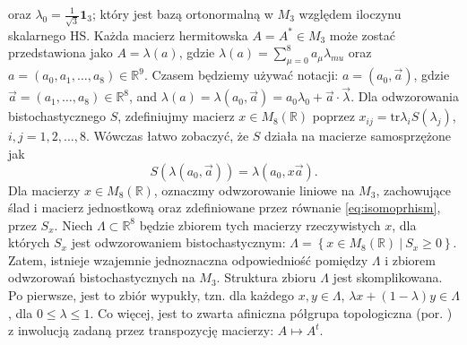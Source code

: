 oraz $\lambda_{0} = \frac{1}{\sqrt{3}} \mathbf{1}_{3}$;
który jest bazą ortonormalną w $M_{3}$ względem iloczynu skalarnego HS.
Każda macierz hermitowska $A = A^{*} \in M_{3}$ może zostać przedstawiona
jako $A = \lambda(a)$, gdzie
$\lambda(a) = \sum_{\mu=0}^{8} a_{\mu} \lambda_{mu}$
oraz
$a = (a_{0}, a_{1}, \ldots, a_{8}) \in \mathbb{R}^{9}$.
Czasem będziemy używać notacji:
$a = (a_{0}, \vec{a})$,
gdzie $\vec{a} = (a_{1},\ldots,a_{8}) \in \mathbb{R}^{8}$,
and $\lambda(a) = \lambda(a_{0}, \vec{a}) = a_{0} \lambda_{0} + \vec{a} \cdot \vec{\lambda}$.
Dla odwzorowania bistochastycznego $S$,
zdefiniujmy macierz $x \in M_{8}(\mathbb{R})$ poprzez
$x_{ij} = \text{tr} \lambda_{i} S(\lambda_{j})$,
$i,j = 1,2,\ldots,8$.
Wówczas łatwo zobaczyć, że $S$ działa na macierze samosprzężone jak
\begin{equation}
\label{eq:isomoprhism}
S(\lambda(a_{0}, \vec{a})) = \lambda(a_{0}, x \vec{a}).
\end{equation}
Dla macierzy $x \in M_{8}(\mathbb{R})$,
oznaczmy odwzorowanie liniowe na $M_{3}$,
zachowujące ślad i macierz jednostkową
oraz zdefiniowane przez równanie \eqref{eq:isomoprhism},
przez $S_{x}$.
Niech $\Lambda \subset \mathbb{R}^{8}$ będzie zbiorem tych macierzy
rzeczywistych $x$,
dla których $S_{x}$ jest odwzorowaniem bistochastycznym:
$\Lambda = \left \{ x \in M_{8}(\mathbb{R}) \: |  \: S_{x} \geq 0 \right \}$.
Zatem, istnieje wzajemnie jednoznaczna odpowiedniość pomiędzy $\Lambda$
i zbiorem odwzorowań bistochastycznych na $M_{3}$.
Struktura zbioru $\Lambda$ jest skomplikowana.
Po pierwsze, jest to zbiór wypukły,
tzn. dla każdego $x,y \in \Lambda$,
$\lambda x + (1-\lambda)y \in \Lambda$,
dla $0 \leq \lambda \leq 1$.
Co więcej, jest to zwarta afiniczna półgrupa topologiczna
(por. \cite{schwarz1955hausdorff,chow1975compact})
z inwolucją zadaną przez transpozycję macierzy: $A \mapsto A^{t}$.

